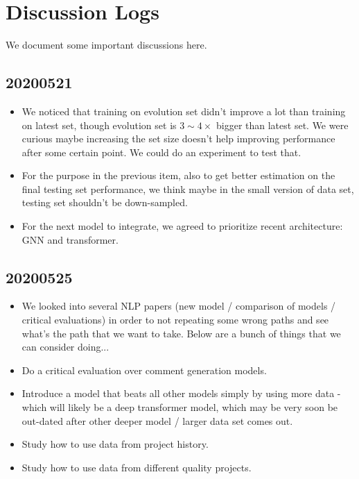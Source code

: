 \section{Discussion Logs}

We document some important discussions here.

\subsection{20200521}

\begin{itemize}
\item We noticed that training on evolution set didn't improve a lot
  than training on latest set, though evolution set is $3 \sim 4
  \times$ bigger than latest set.  We were curious maybe increasing
  the set size doesn't help improving performance after some certain
  point.  We could do an experiment to test that.
\item For the purpose in the previous item, also to get better
  estimation on the final testing set performance, we think maybe in
  the small version of data set, testing set shouldn't be
  down-sampled.
\item For the next model to integrate, we agreed to prioritize recent
  architecture: GNN and transformer.
\end{itemize}


\subsection{20200525}

\begin{itemize}
\item We looked into several NLP papers (new model / comparison of
  models / critical evaluations) in order to not repeating some wrong
  paths and see what's the path that we want to take.  Below are a
  bunch of things that we can consider doing...
\item Do a critical evaluation over comment generation models.
\item Introduce a model that beats all other models simply by using
  more data - which will likely be a deep transformer model, which may
  be very soon be out-dated after other deeper model / larger data set
  comes out.
\item Study how to use data from project history.
\item Study how to use data from different quality projects.
\end{itemize}


